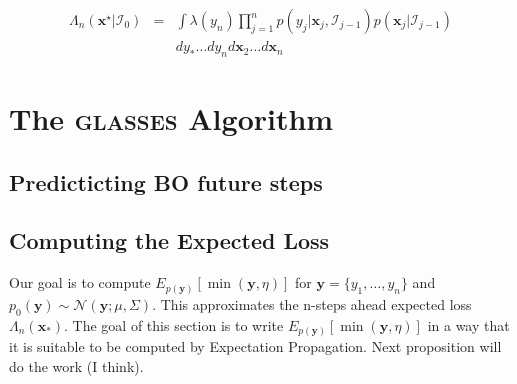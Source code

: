 \documentclass[twoside]{article}
\newcommand{\I}{\mathcal{I}}
\newcommand{\bx}{\textbf{x}}
\newcommand{\by}{\textbf{y}}
\newcommand{\N}{\mathcal{N}}
\newcommand{\acr}[1]{\textsc{#1}\xspace}
\newcommand{\us}{\acr{glasses}}
\begin{document}

\begin{eqnarray}\nonumber
\Lambda_n(\bx^\star|\I_0 ) &= & \int \lambda(y_n) \prod_{j=1}^{n}p(y_{j}|\bx_{j},\I_{j-1}) p(\bx_{j}|\I_{j-1}) \\ \nonumber
& & dy_*\dots dy_n d\bx_2\dots d\bx_n\nonumber
\end{eqnarray}







 \section{The {\us}  Algorithm}

\subsection{Predicticting BO future steps}


\subsection{Computing the Expected Loss}
Our goal is to compute $E_{p(\by)} [\min (\by,\eta)]$ for $\by=\{y_1,\dots,y_n\}$ and $p_0(\by) \sim \N(\by; \mu, \Sigma)$. This  approximates the n-steps ahead expected loss $\Lambda_n(\bx_*)$. The goal of this section is to write  $E_{p(\by)} [\min (\by,\eta)]$ in a way that it is suitable to be computed by Expectation Propagation. Next proposition will do the work (I think).
\end{document}
